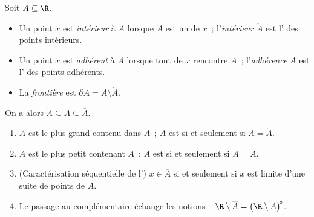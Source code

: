 \begin{definition}\label{def:b1:topology:closure}
Soit $A \subseteq \R$.
\begin{itemize}
  \item Un point $x$ est \emph{intérieur} à $A$ lorsque $A$ est un
         de $x$~; l'\emph{intérieur}
        $\mathring{A}$ est l' des points
        intérieurs.
  \item Un point $x$ est \emph{adhérent} à $A$ lorsque tout 
        de $x$ rencontre $A$~; l'\emph{adhérence}
        $\overline{A}$ est l' des points
        adhérents.
  \item La \emph{frontière} est $\partial A = \overline A \setminus
        \mathring A$.
\end{itemize}
On a alors $\mathring A \subseteq A \subseteq \overline A$.
\end{definition}

\begin{proposition}\label{prop:b1:topology:closureprops}
\begin{enumerate}
  \item $\mathring A$ est le plus grand  contenu dans $A$~; $A$
        est  si et seulement si $A = \mathring A$.
  \item $\overline A$ est le plus petit  contenant $A$~; $A$
        est  si et seulement si $A = \overline A$.
  \item (Caractérisation séquentielle de l') $x \in \overline
        A$ si et seulement si $x$ est limite d'une suite de points de
        $A$.
  \item Le passage au complémentaire échange les notions~: $\R \setminus
        \overline A = \bigl(\R \setminus A\bigr)^{\!\circ}$.
\end{enumerate}
\end{proposition}

